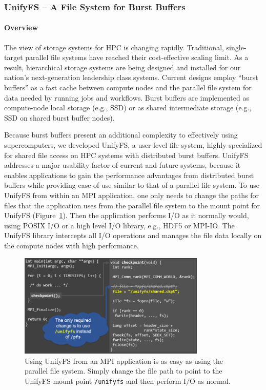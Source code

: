 \subsubsection{ UnifyFS -- A File System for Burst Buffers}

\paragraph{Overview}

The view of storage systems for HPC is changing rapidly. Traditional,
single-target parallel file systems have reached their cost-effective
scaling limit. As a result, hierarchical storage systems are being designed
and installed for our nation's next-generation leadership class systems.
Current designs employ “burst buffers” as a fast cache between compute
nodes and the parallel file system for data needed by running jobs and
workflows. Burst buffers are implemented as compute-node local storage
(e.g., SSD) or as shared intermediate storage (e.g., SSD on shared burst
buffer nodes).

Because burst buffers present an additional complexity to effectively
using supercomputers, we developed UnifyFS, a user-level file system,
highly-specialized for shared file access on HPC systems with distributed
burst buffers.  UnifyFS addresses a major usability
factor of current and future systems, because it enables
applications to gain the performance advantages from distributed burst buffers
while providing ease of use similar to that of a parallel file system.
To use UnifyFS from within an MPI application, one only needs to change
the paths for files that the application uses from the parallel file system
to the mount point for UnifyFS (Figure~\ref{fig:usingUnifyFS}). Then the application
performs I/O as it normally would, using POSIX I/O or a high level I/O library, e.g.,
HDF5 or MPI-IO. The UnifyFS library intercepts all I/O operations and
manages the file data locally on the compute nodes with high performance.

\begin{figure}[htb]
        \centering
        \includegraphics[width=3.5in]{projects/2.3.4-DataViz/2.3.4.15-HDF5-UnifyCR/usingUnifyFS}
        \caption{\label{fig:usingUnifyFS} 
Using UnifyFS from an MPI application is as easy as using the parallel file system.
Simply change the file path to point to the UnifyFS mount point \texttt{/unifyfs} and
then perform I/O as normal.}
\end{figure}


